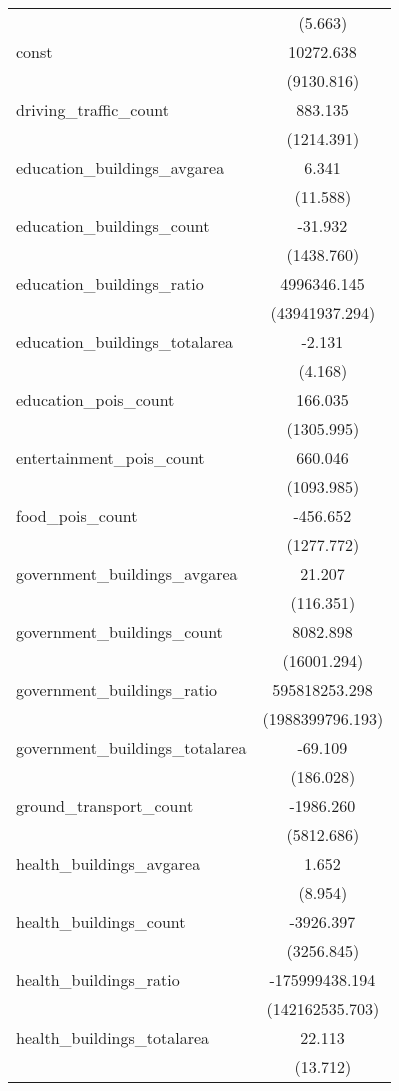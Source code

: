\begin{table}[!htbp]
\begin{tabular}{@{\extracolsep{5pt}}lc}
  & (5.663) \\
 const & 10272.638$^{}$ \\
  & (9130.816) \\
 driving_traffic_count & 883.135$^{}$ \\
  & (1214.391) \\
 education_buildings_avgarea & 6.341$^{}$ \\
  & (11.588) \\
 education_buildings_count & -31.932$^{}$ \\
  & (1438.760) \\
 education_buildings_ratio & 4996346.145$^{}$ \\
  & (43941937.294) \\
 education_buildings_totalarea & -2.131$^{}$ \\
  & (4.168) \\
 education_pois_count & 166.035$^{}$ \\
  & (1305.995) \\
 entertainment_pois_count & 660.046$^{}$ \\
  & (1093.985) \\
 food_pois_count & -456.652$^{}$ \\
  & (1277.772) \\
 government_buildings_avgarea & 21.207$^{}$ \\
  & (116.351) \\
 government_buildings_count & 8082.898$^{}$ \\
  & (16001.294) \\
 government_buildings_ratio & 595818253.298$^{}$ \\
  & (1988399796.193) \\
 government_buildings_totalarea & -69.109$^{}$ \\
  & (186.028) \\
 ground_transport_count & -1986.260$^{}$ \\
  & (5812.686) \\
 health_buildings_avgarea & 1.652$^{}$ \\
  & (8.954) \\
 health_buildings_count & -3926.397$^{}$ \\
  & (3256.845) \\
 health_buildings_ratio & -175999438.194$^{}$ \\
  & (142162535.703) \\
 health_buildings_totalarea & 22.113$^{}$ \\
  & (13.712) \\

\end{tabular}
\end{table}
